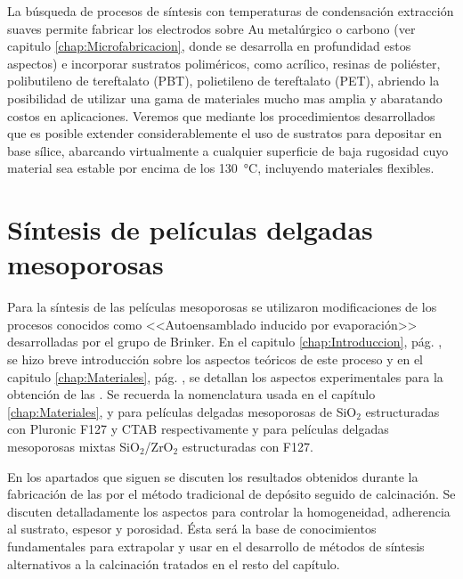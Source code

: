 	La búsqueda de procesos de síntesis con temperaturas de condensación extracción suaves permite fabricar los electrodos sobre Au metalúrgico o carbono (ver capitulo \ref{chap:Microfabricacion}, donde se desarrolla en profundidad estos aspectos) e incorporar sustratos poliméricos, como acrílico, resinas de poliéster, polibutileno de tereftalato (PBT), polietileno de tereftalato (PET), abriendo la posibilidad de utilizar una gama de materiales mucho mas amplia y abaratando costos en aplicaciones.	Veremos que mediante los procedimientos desarrollados que es posible extender considerablemente el uso de sustratos para depositar \pdm\space en base sílice, abarcando virtualmente a cualquier superficie de baja rugosidad cuyo material sea estable por encima de los \SI{130}{\celsius}, incluyendo materiales flexibles.
	
\section{Síntesis de películas delgadas mesoporosas}
		
		Para la síntesis de las películas mesoporosas se utilizaron modificaciones de los procesos conocidos como <<Autoensamblado inducido por evaporación>> desarrolladas por el grupo de Brinker.\cite{Brinker1999} En el capitulo \ref{chap:Introduccion}, pág. \pageref{sec:mesoporosos}, se hizo breve introducción sobre los aspectos teóricos de este proceso y en el capitulo \ref{chap:Materiales}, pág. \pageref{sec:sintesis_mesoporosos}, se detallan los aspectos experimentales para la obtención de las \pdm. Se recuerda la nomenclatura usada en el capítulo \ref{chap:Materiales}, \pdmF\space y \pdmC\space para películas delgadas mesoporosas de SiO$_2$ estructuradas con Pluronic F127 y CTAB respectivamente y \pdmZ\space para películas delgadas mesoporosas mixtas SiO$_2$/ZrO$_2$ estructuradas con F127.

		En los apartados que siguen se discuten los resultados obtenidos durante la fabricación de las \pdm\space por el método tradicional de depósito seguido de calcinación. Se discuten detalladamente los aspectos para controlar la homogeneidad, adherencia al sustrato, espesor y porosidad. Ésta será la base de conocimientos fundamentales para extrapolar y usar en el desarrollo de métodos de síntesis alternativos a la calcinación tratados en el resto del capítulo.

